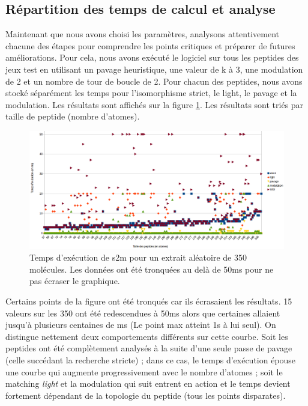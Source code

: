 \subsection{Répartition des temps de calcul et analyse}

Maintenant que nous avons choisi les paramètres, analysons attentivement chacune des étapes pour comprendre les points critiques et préparer de futures améliorations.
Pour cela, nous avons exécuté le logiciel sur tous les peptides des jeux test en utilisant un pavage heuristique, une valeur de k à 3, une modulation de 2 et un nombre de tour de boucle de 2.
Pour chacun des peptides, nous avons stocké séparément les temps pour l'isomorphisme strict, le light, le pavage et la modulation.
Les résultats sont affichés sur la figure \ref{temps_calcul}.
Les résultats sont triés par taille de peptide (nombre d'atomes).

\begin{figure}[!ht]
  \begin{center}
    \includegraphics[width=450px]{Figures/s2m/results/temps_detail.png}
    \caption{\label{temps_calcul}Temps d'exécution de s2m pour un extrait aléatoire de 350 molécules.
    Les données ont été tronquées au delà de 50ms pour ne pas écraser le graphique.}
  \end{center}
\end{figure}

Certains points de la figure ont été tronqués car ils écrasaient les résultats.
15 valeurs sur les 350 ont été redescendues à 50ms alors que certaines allaient jusqu'à plusieurs centaines de ms (Le point max atteint 1s à lui seul).
On distingue nettement deux comportements différents sur cette courbe.
Soit les peptides ont été complètement analysés à la suite d'une seule passe de pavage (celle succédant la recherche stricte) ; dans ce cas, le temps d'exécution épouse une courbe qui augmente progressivement avec le nombre d'atomes ; soit le matching \textit{light} et la modulation qui suit entrent en action et le temps devient fortement dépendant de la topologie du peptide (tous les points disparates).

